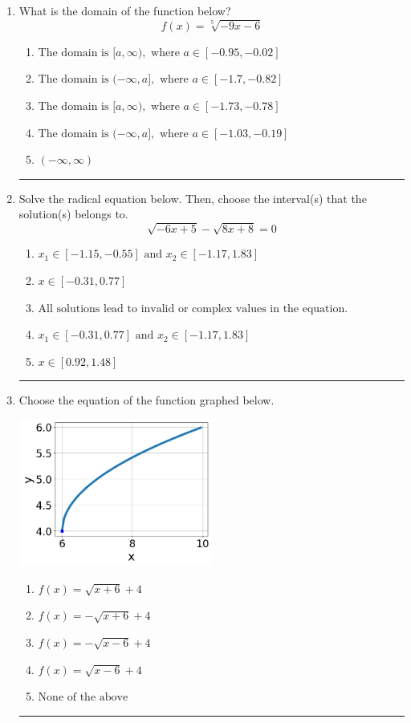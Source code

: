 \documentclass[14pt]{extbook}
\newcommand{\litem}[1]{\item#1\hspace*{-1cm}\rule{\textwidth}{0.4pt}}
\begin{document}
\begin{enumerate}
{\begin{enumerate}[label=\Alph*.]
\end{enumerate} }
\litem{
What is the domain of the function below?\[ f(x) = \sqrt[5]{-9 x - 6} \]\begin{enumerate}[label=\Alph*.]
\item \( \text{The domain is } [a, \infty), \text{   where } a \in [-0.95, -0.02] \)
\item \( \text{The domain is } (-\infty, a], \text{   where } a \in [-1.7, -0.82] \)
\item \( \text{The domain is } [a, \infty), \text{   where } a \in [-1.73, -0.78] \)
\item \( \text{The domain is } (-\infty, a], \text{   where } a \in [-1.03, -0.19] \)
\item \( (-\infty, \infty) \)

\end{enumerate} }
\litem{
Solve the radical equation below. Then, choose the interval(s) that the solution(s) belongs to.\[ \sqrt{-6 x + 5} - \sqrt{8 x + 8} = 0 \]\begin{enumerate}[label=\Alph*.]
\item \( x_1 \in [-1.15, -0.55] \text{ and } x_2 \in [-1.17,1.83] \)
\item \( x \in [-0.31,0.77] \)
\item \( \text{All solutions lead to invalid or complex values in the equation.} \)
\item \( x_1 \in [-0.31, 0.77] \text{ and } x_2 \in [-1.17,1.83] \)
\item \( x \in [0.92,1.48] \)

\end{enumerate} }
\litem{
Choose the equation of the function graphed below.
\begin{center}
    \includegraphics[width=0.5\textwidth]{../Figures/radicalGraphToEquationCopyB.png}
\end{center}
\begin{enumerate}[label=\Alph*.]
\item \( f(x) = \sqrt{x + 6} + 4 \)
\item \( f(x) = - \sqrt{x + 6} + 4 \)
\item \( f(x) = - \sqrt{x - 6} + 4 \)
\item \( f(x) = \sqrt{x - 6} + 4 \)
\item \( \text{None of the above} \)


\end{enumerate}}
\end{enumerate}
\end{document}
